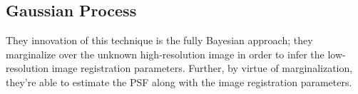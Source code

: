 %
%
\subsection{Gaussian Process}\label{subsec:gaussianprocess}
%
They innovation of this technique is the fully Bayesian approach; they marginalize over the unknown high-resolution image in order to infer the low-resolution image registration parameters.
%
Further, by virtue of marginalization, they're able to estimate the PSF along with the image registration parameters.